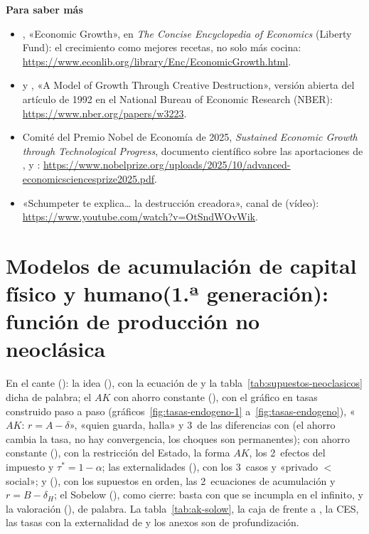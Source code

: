 \documentclass[11pt]{article}
\begin{document}
\begin{anotaciones}
\textbf{Para saber más}
\begin{itemize}
\item {}, «Economic Growth», en \emph{The Concise Encyclopedia of Economics} (Liberty Fund): el crecimiento como mejores recetas, no solo más cocina: \url{https://www.econlib.org/library/Enc/EconomicGrowth.html}\nocite{Romer2008Econlib}.
\item {} y , «A Model of Growth Through Creative Destruction», versión abierta del artículo de 1992 en el National Bureau of Economic Research (NBER): \url{https://www.nber.org/papers/w3223}\nocite{AghionHowitt1990}.
\item Comité del Premio Nobel de Economía de 2025, \emph{Sustained Economic Growth through Technological Progress}, documento científico sobre las aportaciones de ,  y : \url{https://www.nobelprize.org/uploads/2025/10/advanced-economicsciencesprize2025.pdf}\nocite{Nobel2025Advanced}.
\item «Schumpeter te explica\ldots{} la destrucción creadora», canal de  (vídeo): \url{https://www.youtube.com/watch?v=OtSndWOvWik}\nocite{VaraSchumpeter}.
\end{itemize}
\end{anotaciones}

\section{Modelos de acumulación de capital físico y humano\newline (1.ª generación): función de producción no neoclásica}\label{sec:primera-generacion}

\begin{notaopositor}
En el cante (): la idea (), con la ecuación de  y la tabla~\ref{tab:supuestos-neoclasicos} dicha de palabra; el $AK$ con ahorro constante (), con el gráfico en tasas construido paso a paso (gráficos~\ref{fig:tasas-endogeno-1} a~\ref{fig:tasas-endogeno}), «$AK$: $r=A-\delta$», «quien guarda, halla» y 3~de las diferencias con  (el ahorro cambia la tasa, no hay convergencia, los choques son permanentes);  con ahorro constante (), con la restricción del Estado, la forma $AK$, los 2~efectos del impuesto y $\tau^*=1-\alpha$; las externalidades (), con los 3~casos y «privado $<$ social»;  y  (), con los supuestos en orden, las 2~ecuaciones de acumulación y $r=B-\delta_H$; el Sobelow (), como cierre: basta con que se incumpla  en el infinito, y la valoración (), de palabra. La tabla~\ref{tab:ak-solow}, la caja de  frente a , la CES, las tasas con la externalidad de  y los anexos son de profundización.
\end{notaopositor}
\end{document}
